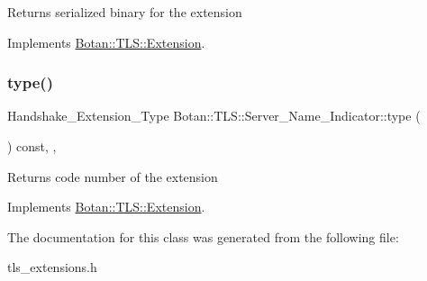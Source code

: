 \begin{DoxyReturn}{Returns}
serialized binary for the extension 
\end{DoxyReturn}


Implements \hyperlink{class_botan_1_1_t_l_s_1_1_extension_a56788726ad2526db54e5a26039cb69db}{Botan\+::\+T\+L\+S\+::\+Extension}.

\mbox{\label{class_botan_1_1_t_l_s_1_1_server___name___indicator_a3ecbe137658cbab2797a05441e65f42f}} 
\subsubsection{\texorpdfstring{type()}{type()}}
{\footnotesize\ttfamily Handshake\+\_\+\+Extension\+\_\+\+Type Botan\+::\+T\+L\+S\+::\+Server\+\_\+\+Name\+\_\+\+Indicator\+::type (\begin{DoxyParamCaption}{ }\end{DoxyParamCaption}) const\hspace{0.3cm}{\ttfamily [inline]}, {\ttfamily [override]}, {\ttfamily [virtual]}}

\begin{DoxyReturn}{Returns}
code number of the extension 
\end{DoxyReturn}


Implements \hyperlink{class_botan_1_1_t_l_s_1_1_extension_ac8819b312ce604453225e7b4f7c373ec}{Botan\+::\+T\+L\+S\+::\+Extension}.



The documentation for this class was generated from the following file\+:\begin{DoxyCompactItemize}
\item 
tls\+\_\+extensions.\+h\end{DoxyCompactItemize}
